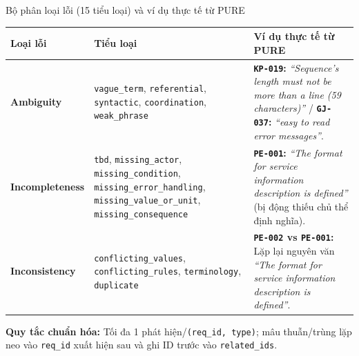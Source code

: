 \documentclass[aspectratio=169,10pt]{beamer}
\begin{document}
\begin{frame}{Bộ phân loại lỗi (15 tiểu loại) và ví dụ thực tế từ PURE}
  \small
  \begin{tabular}{p{2.35cm}p{3.8cm}p{6.05cm}}
    \toprule
    \textbf{Loại lỗi} & \textbf{Tiểu loại} & \textbf{Ví dụ thực tế từ PURE} \\
    \midrule
    \textbf{Ambiguity} & \texttt{vague\_term}, \texttt{referential}, \texttt{syntactic}, \texttt{coordination}, \texttt{weak\_phrase} & \textbf{\texttt{KP-019}:} \textit{``Sequence's length must not be more than a line (59 characters)''} / \textbf{\texttt{GJ-037}:} \textit{``easy to read error messages''}. \\
    \midrule
    \textbf{Incompleteness} & \texttt{tbd}, \texttt{missing\_actor}, \texttt{missing\_condition}, \texttt{missing\_error\_handling}, \texttt{missing\_value\_or\_unit}, \texttt{missing\_consequence} & \textbf{\texttt{PE-001}:} \textit{``The format for service information description is defined''} (bị động thiếu chủ thể định nghĩa). \\
    \midrule
    \textbf{Inconsistency} & \texttt{conflicting\_values}, \texttt{conflicting\_rules}, \texttt{terminology}, \texttt{duplicate} & \textbf{\texttt{PE-002} vs \texttt{PE-001}:} Lặp lại nguyên văn \textit{``The format for service information description is defined''}. \\
    \bottomrule
  \end{tabular}
  \vspace{0.15cm}
  {\footnotesize \textbf{Quy tắc chuẩn hóa:} Tối đa 1 phát hiện/\texttt{(req\_id, type)}; mâu thuẫn/trùng lặp neo vào \texttt{req\_id} xuất hiện sau và ghi ID trước vào \texttt{related\_ids}.}
\end{frame}
\end{document}
